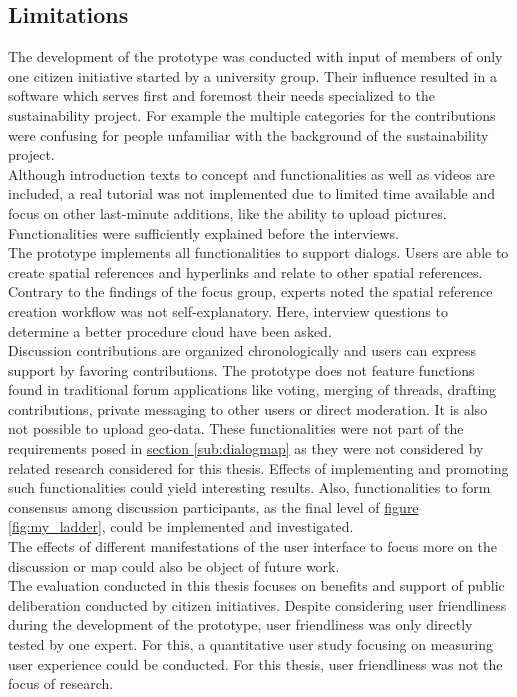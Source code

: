 \subsection{Limitations}
\label{sub:limitations}
The development of the prototype was conducted with input of members of only one citizen initiative started by a university group. Their influence resulted in a software which serves first and foremost their needs specialized to the sustainability project. For example the multiple categories for the contributions were confusing for people unfamiliar with the background of the sustainability project.\\
Although introduction texts to concept and functionalities as well as videos are included, a real tutorial was not implemented due to limited time available and focus on other last-minute additions, like the ability to upload pictures. Functionalities were sufficiently explained before the interviews.\\
The prototype implements all functionalities to support dialogs. Users are able to create spatial references and hyperlinks and relate to other spatial references. Contrary to the findings of the focus group, experts noted the spatial reference creation workflow was not self-explanatory. Here, interview questions to determine a better procedure cloud have been asked.\\
Discussion contributions are organized chronologically and users can express support by favoring contributions. The prototype does not feature functions found in traditional forum applications like voting, merging of threads, drafting contributions, private messaging to other users or direct moderation. It is also not possible to upload geo-data. These functionalities were not part of the requirements posed in \hyperref[sub:dialogmap]{section \ref{sub:dialogmap}} as they were not considered by related research considered for this thesis. Effects of implementing and promoting such functionalities could yield interesting results. Also, functionalities to form consensus among discussion participants, as the final level of \hyperref[fig:my_ladder]{figure \ref{fig:my_ladder}}, could be implemented and investigated.\\
The effects of different manifestations of the user interface to focus more on the discussion or map could also be object of future work.\\
The evaluation conducted in this thesis focuses on benefits and support of public deliberation conducted by citizen initiatives. Despite considering user friendliness during the development of the prototype, user friendliness was only directly tested by one expert. For this, a quantitative user study focusing on measuring user experience could be conducted. For this thesis, user friendliness was not the focus of research.\\
